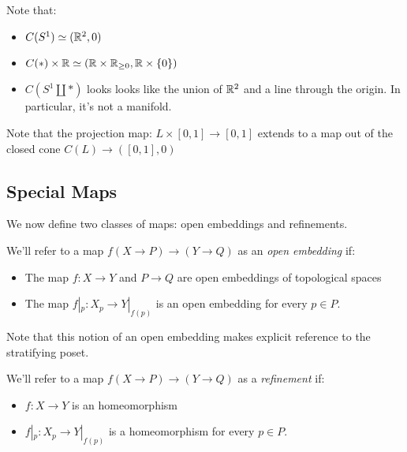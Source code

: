 \begin{ex}
Note that:
\begin{itemize}
    \item $C(S^1) \simeq (\mathbb{R}^2, 0)$
    \item $C(*)\times \mathbb{R} \simeq (\mathbb{R} \times \mathbb{R}_{\geq 0}, \mathbb{R} \times \{0\})$ 
    \item $C( S^1 \amalg *)$ looks looks like the union of $\mathbb{R}^2$ and a line
    through the origin. In particular, it's not a manifold. 
\end{itemize}
\end{ex}

\begin{rek} 
    Note that the projection map: $L\times [0, 1] \rightarrow [0, 1]$
    extends to a map out of the closed cone $C(L)\rightarrow ([0, 1], 0)$
\end{rek}



\subsection{Special Maps}

We now define two classes of maps: open embeddings and refinements. 

\begin{defi}
    We'll refer to a map $f (X\rightarrow P) \rightarrow (Y
    \rightarrow Q)$ as an \textit{open embedding} if:
\begin{itemize}
    \item The map $f: X \rightarrow Y$ and $P\rightarrow Q$ are open embeddings
    of topological spaces 
    \item The map $f|_p: X_p \rightarrow Y|_{f(p)}$ is an open embedding for 
    every $p \in P$.
\end{itemize}
\end{defi}

\begin{rek}
    Note that this notion of an open embedding makes explicit reference to the 
    stratifying poset. 
\end{rek}

\begin{defi}
We'll refer to a map $f (X\rightarrow P) \rightarrow (Y \rightarrow Q)$ as a \textit{refinement} if: 
\begin{itemize}
    \item $f: X \rightarrow Y$ is an homeomorphism
    \item $f|_p: X_p \rightarrow Y|_{f(p)}$ is a homeomorphism for every $p 
    \in P$.
\end{itemize}
\end{defi}

